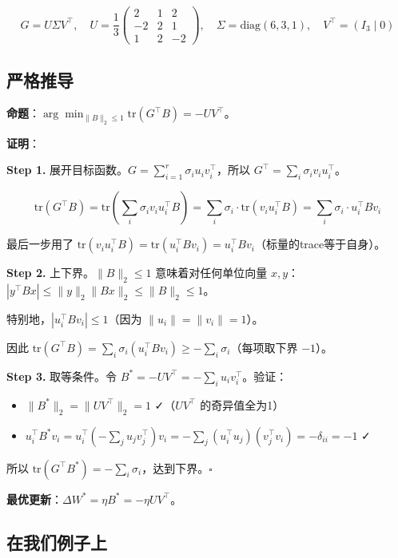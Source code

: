 \documentclass[12pt,a4paper]{article}
\begin{document}
\[G = U\Sigma V^\top, \quad U = \frac{1}{3}\begin{pmatrix}2&1&2\\-2&2&1\\1&2&-2\end{pmatrix},\quad \Sigma = \text{diag}(6,3,1),\quad V^\top = (I_3 \mid 0)\]


\subsection{严格推导}

\textbf{命题}：$\arg\min_{\|B\|_2 \le 1} \text{tr}(G^\top B) = -UV^\top$。

\textbf{证明}：

\textbf{Step 1.} 展开目标函数。$G = \sum_{i=1}^r \sigma_i u_i v_i^\top$，所以 $G^\top = \sum_i \sigma_i v_i u_i^\top$。


\[\text{tr}(G^\top B) = \text{tr}\!\left(\sum_i \sigma_i v_i u_i^\top B\right) = \sum_i \sigma_i \cdot \text{tr}(v_i u_i^\top B) = \sum_i \sigma_i \cdot u_i^\top B v_i\]

最后一步用了 $\text{tr}(v_i u_i^\top B) = \text{tr}(u_i^\top B v_i) = u_i^\top B v_i$（标量的trace等于自身）。

\textbf{Step 2.} 上下界。$\|B\|_2 \le 1$ 意味着对任何单位向量 $x, y$：$|y^\top B x| \le \|y\|_2 \|Bx\|_2 \le \|B\|_2 \le 1$。

特别地，$|u_i^\top B v_i| \le 1$（因为 $\|u_i\|=\|v_i\|=1$）。

因此 $\text{tr}(G^\top B) = \sum_i \sigma_i (u_i^\top B v_i) \ge -\sum_i \sigma_i$（每项取下界 $-1$）。

\textbf{Step 3.} 取等条件。令 $B^* = -UV^\top = -\sum_i u_i v_i^\top$。验证：

\begin{itemize}[leftmargin=*,nosep]
\item $\|B^*\|_2 = \|UV^\top\|_2 = 1$ ✓（$UV^\top$ 的奇异值全为1）
\item $u_i^\top B^* v_i = u_i^\top (-\sum_j u_j v_j^\top) v_i = -\sum_j (u_i^\top u_j)(v_j^\top v_i) = -\delta_{ii} = -1$ ✓
\end{itemize}


所以 $\text{tr}(G^\top B^*) = -\sum_i \sigma_i$，达到下界。$\square$

\textbf{最优更新}：$\Delta W^* = \eta B^* = -\eta UV^\top$。


\subsection{在我们例子上}
\end{document}
